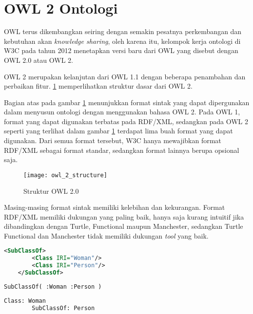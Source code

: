 \section{OWL 2 Ontologi}
OWL terus dikembangkan seiring dengan semakin pesatnya perkembangan dan kebutuhan akan \emph{knowledge sharing}, oleh karena itu, kelompok kerja ontologi di W3C pada tahun 2012 menetapkan versi baru dari OWL yang disebut dengan OWL 2.0 atau OWL 2.

OWL 2 merupakan kelanjutan dari OWL 1.1 dengan beberapa penambahan dan perbaikan fitur. \ref{fig:owl_2_structure} memperlihatkan struktur dasar dari OWL 2.

Bagian atas pada gambar \ref{fig:owl_2_structure} menunjukkan format sintak yang dapat dipergunakan dalam menyusun ontologi dengan menggunakan bahasa OWL 2. Pada OWL 1, format yang dapat digunakan terbatas pada RDF/XML, sedangkan pada OWL 2 seperti yang terlihat dalam gambar \ref{fig:owl_2_structure} terdapat lima buah format yang dapat digunakan. Dari semua format tersebut, W3C hanya mewajibkan format RDF/XML sebagai format standar, sedangkan format lainnya berupa opsional saja.

\begin{figure}[htp]
	\centering
	\texttt{[image: owl\_2\_structure]}
	\caption{Struktur OWL 2.0}
	\label{fig:owl_2_structure}
\end{figure}

Masing-masing format sintak memiliki kelebihan dan kekurangan. Format RDF/XML memiliki dukungan yang paling baik, hanya saja kurang intuitif jika dibandingkan dengan Turtle, Functional maupun Manchester, sedangkan Turtle Functional dan Manchester tidak memiliki dukungan \emph{tool} yang baik.

\begin{lstlisting}[language=XML, caption=contoh sintak RDF/XML, xleftmargin=0pt]
	<SubClassOf>
		<Class IRI="Woman"/>
		<Class IRI="Person"/>
	</SubClassOf>
\end{lstlisting}

\begin{lstlisting}[language=XML, caption=contoh sintak functional, xleftmargin=0pt]
	SubClassOf( :Woman :Person )
\end{lstlisting}
	
\begin{lstlisting}[language=XML, caption=contoh manchester syntax, xleftmargin=0pt]
	Class: Woman
		SubClassOf: Person
\end{lstlisting}

